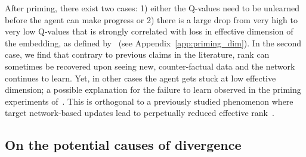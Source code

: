 After priming, there exist two cases: 1) either the Q-values need to be unlearned before the agent can make progress or 2) there is a large drop from very high to very low Q-values that is strongly correlated with loss in effective dimension of the embedding, as defined by~\cite{yang2020harnessing} (see Appendix~\ref{app:priming_dim}). In the second case, we find that contrary to previous claims in the literature, rank can sometimes be recovered upon seeing new, counter-factual data and the network continues to learn. Yet, in other cases the agent gets stuck at low effective dimension; a possible explanation for the failure to learn observed in the priming experiments of~\textcite{nikishin2022primacy}. This is orthogonal to a previously studied phenomenon where target network-based updates lead to perpetually reduced effective rank~\parencite{kumar2021implicit}.



\subsection{On the potential causes of divergence} \label{sec:causes}

